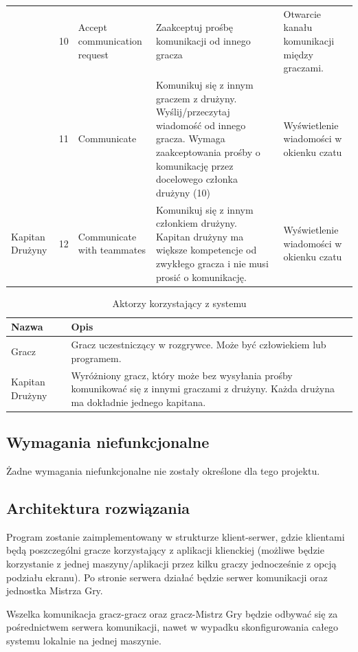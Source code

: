 \documentclass[11pt]{article}
\let\Oldsubsection\subsection
\renewcommand{\subsection}{\FloatBarrier\Oldsubsection}
\begin{document}
\begin{longtable}{|p{}|p{}|p{}|p{}|p{}|}
	& 10 & Accept communication request & Zaakceptuj prośbę komunikacji od innego gracza & Otwarcie kanału komunikacji między graczami. \\ \cline{2-5}
	& 11 & Communicate & Komunikuj się z innym graczem z drużyny. Wyślij/przeczytaj wiadomość od innego gracza. Wymaga zaakceptowania prośby o komunikację przez docelowego członka drużyny (10) & Wyświetlenie wiadomości w okienku czatu \\ \hline
Kapitan Drużyny & 12 & Communicate with teammates & Komunikuj się z innym członkiem drużyny. Kapitan drużyny ma większe kompetencje od zwykłego gracza i nie musi prosić o komunikację. & Wyświetlenie wiadomości w okienku czatu \\ \hline
\end{longtable}
\FloatBarrier

\begin{longtable}[!h]{|p{}|p{}|}
\caption{Aktorzy korzystający z systemu}
\\ \hline
Nazwa & Opis \\ \hline
Gracz & Gracz uczestniczący w rozgrywce. Może być człowiekiem lub programem. \\ \hline
Kapitan Drużyny & Wyróżniony gracz, który może bez wysyłania prośby komunikować się z innymi graczami z drużyny. Każda drużyna ma dokładnie jednego kapitana. \\ \hline
\end{longtable}
\FloatBarrier

\subsection{Wymagania niefunkcjonalne}
\par
Żadne wymagania niefunkcjonalne nie zostały określone dla tego projektu.

\subsection{Architektura rozwiązania}
\par
Program zostanie zaimplementowany w strukturze klient-serwer, gdzie klientami będą poszczególni gracze korzystający z aplikacji klienckiej (możliwe będzie korzystanie z jednej maszyny/aplikacji przez kilku graczy jednocześnie z opcją podziału ekranu). Po stronie serwera działać będzie serwer komunikacji oraz jednostka Mistrza Gry.
\par
Wszelka komunikacja gracz-gracz oraz gracz-Mistrz Gry będzie odbywać się za pośrednictwem serwera komunikacji, nawet w wypadku skonfigurowania całego systemu lokalnie na jednej maszynie.
\end{document}
